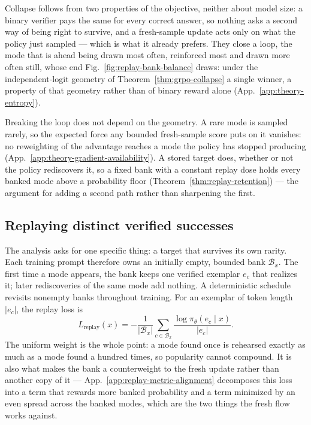 \documentclass{article}
\newcommand{\1}{\mathbf 1}
\theoremstyle{remark}
\theoremstyle{definition}
\theoremstyle{plain}
\begin{document}
Collapse follows from two properties of the objective, neither about model
size: a binary verifier pays the same for every correct answer, so nothing asks
a second way of being right to survive, and a fresh-sample update acts only on
what the policy just sampled --- which is what it already prefers. They close a
loop, the mode that is ahead being drawn most often, reinforced most and drawn
more often still, whose end Fig.~\ref{fig:replay-bank-balance} draws: under the
independent-logit geometry of Theorem~\ref{thm:grpo-collapse} a single winner,
a property of that geometry rather than of binary reward alone
(App.~\ref{app:theory-entropy}).

Breaking the loop does not depend on the geometry. A rare mode is sampled
rarely, so the expected force any bounded fresh-sample score puts on it
vanishes: no reweighting of the advantage reaches a mode the policy has stopped
producing (App.~\ref{app:theory-gradient-availability}). A stored target does,
whether or not the policy rediscovers it, so a fixed bank with a constant
replay dose holds every banked mode above a probability floor
(Theorem~\ref{thm:replay-retention}) --- the argument for adding a second path
rather than sharpening the first.

\subsection{Replaying distinct verified successes}
\label{sec:replay}

The analysis asks for one specific thing: a target that survives its own rarity.
Each training prompt therefore owns an initially empty, bounded bank
$\mathcal B_x$. The first time a mode appears, the bank keeps one verified
exemplar $e_c$ that realizes it; later rediscoveries of the same mode add
nothing. A deterministic schedule revisits nonempty banks throughout training.
For an exemplar of token length $|e_c|$, the replay loss is
\begin{equation}
 L_{\mathrm{replay}}(x)=-\frac{1}{|\mathcal B_x|}
 \sum_{c\in\mathcal B_x}\frac{\log\pi_\theta(e_c\mid x)}{|e_c|}.
 \label{eq:lm-verified-replay}
\end{equation}
The uniform weight is the whole point: a mode found once is rehearsed exactly as
much as a mode found a hundred times, so popularity cannot compound. It is also
what makes the bank a counterweight to the fresh update rather than
another copy of it --- App.~\ref{app:replay-metric-alignment} decomposes this
loss into a term that rewards more banked probability and a term minimized by an
even spread across the banked modes, which are the two things the fresh flow
works against.
\end{document}
